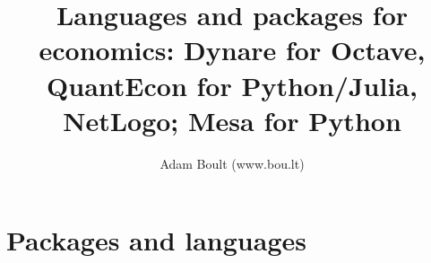 \documentclass[oneside]{book}
\begin{document}
\author{Adam Boult (www.bou.lt)}
\title{Languages and packages for economics: Dynare for Octave, QuantEcon for Python/Julia, NetLogo; Mesa for Python}
\maketitle

\setcounter{tocdepth}{0}
\tableofcontents



\part{Packages and languages}




\end{document}
